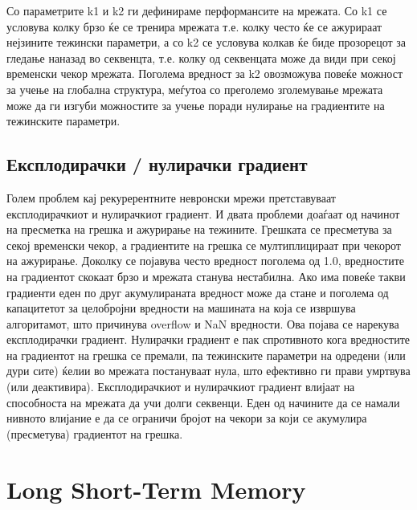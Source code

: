 Со параметрите k1 и k2 ги дефинираме перформансите на мрежата. Со k1 се условува колку брзо ќе се тренира мрежата т.е. колку често ќе се ажурираат нејзините тежински параметри, а со k2 се условува колкав ќе биде прозорецот за гледање наназад во секвенцта, т.е. колку од секвенцата може да види при секој временски чекор мрежата. Поголема вредност за k2 овозможува повеќе можност за учење на глобална структура, меѓутоа со преголемо зголемување мрежата може да ги изгуби можностите за учење поради нулирање на градиентите на тежинските параметри.

\subsection{Експлодирачки / нулирачки градиент}

Голем проблем кај рекурерентните невронски мрежи претставуваат експлодирачкиот и нулирачкиот градиент. И двата проблеми доаѓаат од начинот на пресметка на грешка и ажурирање на тежините. Грешката се пресметува за секој временски чекор, а градиентите на грешка се мултиплицираат при чекорот на ажурирање. Доколку се појавува често вредност поголема од 1.0, вредностите на градиентот скокаат брзо и мрежата станува нестабилна. Ако има повеќе такви градиенти еден по друг акумулираната вредност може да стане и поголема од капацитетот за целобројни вредности на машината на која се извршува алгоритамот, што причинува overflow и NaN вредности. Ова појава се нарекува експлодирачки градиент. Нулирачки градиент е пак спротивното кога вредностите на градиентот на грешка се премали, па тежинските параметри на одредени (или дури сите) ќелии во мрежата постануваат нула, што ефективно ги прави умртвува (или деактивира). Експлодирачкиот и нулирачкиот градиент влијаат на способноста на мрежата да учи долги секвенци. Еден од начините да се намали нивното влијание е да се ограничи бројот на чекори за који се акумулира (пресметува) градиентот на грешка.

\section{Long Short-Term Memory}

